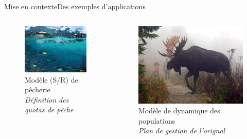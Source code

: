 \documentclass{eecslides}
\begin{document}
\begin{frame}{Mise en contexte}{Des exemples d'applications} 

	\vspace{-\baselineskip}
 	\begin{columns}[t]
 		\centering
 		\begin{column}{0.5\linewidth}
		 \centering
 		\begin{figure}
	 		  \includegraphics[width=0.75\linewidth]{20peche.jpg}
	 		  \caption*{\centering Modèle (S/R) de pêcherie\\
	 		  \textit{Définition des quotas de pêche}}
 		\end{figure}
 		\end{column}
 		\begin{column}{0.5\linewidth}
 		\centering
 		\begin{figure}
	 		  \includegraphics[width=0.75\linewidth]{orignal.jpg}
	 		  \caption*{\centering Modèle de dynamique des populations\\
	 		  \textit{Plan de gestion de l'orignal}}
 		\end{figure}
 	\end{column}
 	\end{columns}

\end{frame}
\end{document}
